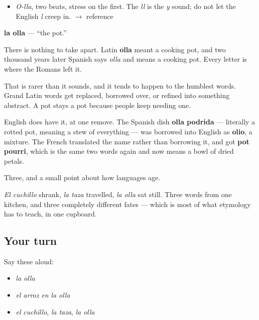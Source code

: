 \begin{sounds}
\begin{itemize}
\raggedright
  \item \emph{O-lla}, two beats, stress on the first. The \emph{ll} is the \emph{y} sound; do not let the English \emph{l} creep in. $\to$ reference
\end{itemize}
\end{sounds}

\begin{cousinweb}
\textbf{la olla} — \textquotedblleft{}the pot.\textquotedblright{}

There is nothing to take apart. Latin \textbf{olla} meant a cooking pot, and two thousand years later Spanish says \emph{olla} and means a cooking pot. Every letter is where the Romans left it.

That is rarer than it sounds, and it tends to happen to the humblest words. Grand Latin words get replaced, borrowed over, or refined into something abstract. A pot stays a pot because people keep needing one.

English does have it, at one remove. The Spanish dish \textbf{olla podrida} — literally a rotted pot, meaning a stew of everything — was borrowed into English as \textbf{olio}, a mixture. The French translated the name rather than borrowing it, and got \textbf{pot pourri}, which is the same two words again and now means a bowl of dried petals.
\end{cousinweb}

\begin{grammarlens}[title={What you've built}]
Three, and a small point about how languages age.

\emph{El cuchillo} shrank, \emph{la taza} travelled, \emph{la olla} sat still. Three words from one kitchen, and three completely different fates — which is most of what etymology has to teach, in one cupboard.
\end{grammarlens}

\subsection*{Your turn}
Say these aloud:

\begin{itemize}
\raggedright
  \item \emph{la olla}
  \item \emph{el arroz en la olla}
  \item \emph{el cuchillo}, \emph{la taza}, \emph{la olla}
\end{itemize}


